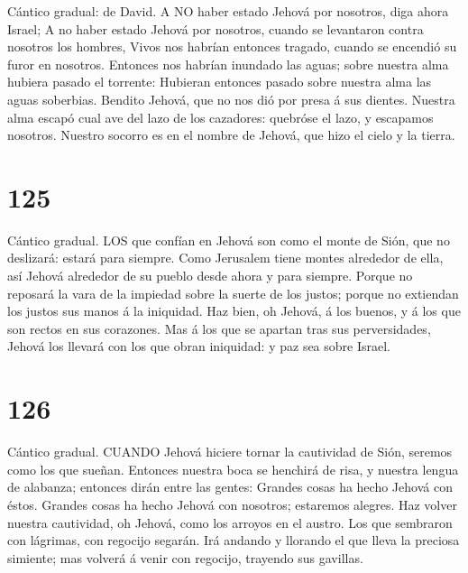  Cántico gradual: de David. A NO haber estado Jehová por
nosotros, diga ahora Israel;  A no haber estado Jehová por
nosotros, cuando se levantaron contra nosotros los hombres, 
Vivos nos habrían entonces tragado, cuando se encendió su furor en
nosotros.  Entonces nos habrían inundado las aguas; sobre
nuestra alma hubiera pasado el torrente:  Hubieran entonces
pasado sobre nuestra alma las aguas soberbias.  Bendito
Jehová, que no nos dió por presa á sus dientes.  Nuestra
alma escapó cual ave del lazo de los cazadores: quebróse el lazo, y
escapamos nosotros.  Nuestro socorro es en el nombre de
Jehová, que hizo el cielo y la tierra.

\hypertarget{section-124}{%
\section{125}\label{section-124}}

 Cántico gradual. LOS que confían en Jehová son como el
monte de Sión, que no deslizará: estará para siempre.  Como
Jerusalem tiene montes alrededor de ella, así Jehová alrededor de su
pueblo desde ahora y para siempre.  Porque no reposará la
vara de la impiedad sobre la suerte de los justos; porque no extiendan
los justos sus manos á la iniquidad.  Haz bien, oh Jehová, á
los buenos, y á los que son rectos en sus corazones.  Mas á
los que se apartan tras sus perversidades, Jehová los llevará con los
que obran iniquidad: y paz sea sobre Israel.

\hypertarget{section-125}{%
\section{126}\label{section-125}}

 Cántico gradual. CUANDO Jehová hiciere tornar la cautividad
de Sión, seremos como los que sueñan.  Entonces nuestra boca
se henchirá de risa, y nuestra lengua de alabanza; entonces dirán entre
las gentes: Grandes cosas ha hecho Jehová con éstos. 
Grandes cosas ha hecho Jehová con nosotros; estaremos alegres.
 Haz volver nuestra cautividad, oh Jehová, como los arroyos
en el austro.  Los que sembraron con lágrimas, con regocijo
segarán.  Irá andando y llorando el que lleva la preciosa
simiente; mas volverá á venir con regocijo, trayendo sus gavillas.

